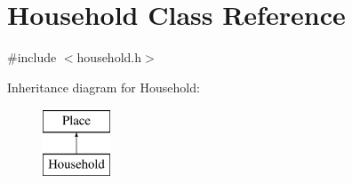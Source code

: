 \hypertarget{classHousehold}{}\section{Household Class Reference}
\label{classHousehold}


{\ttfamily \#include $<$household.\+h$>$}

Inheritance diagram for Household\+:\begin{figure}[H]
\begin{center}
\leavevmode
\includegraphics[height=2.000000cm]{classHousehold}
\end{center}
\end{figure}
